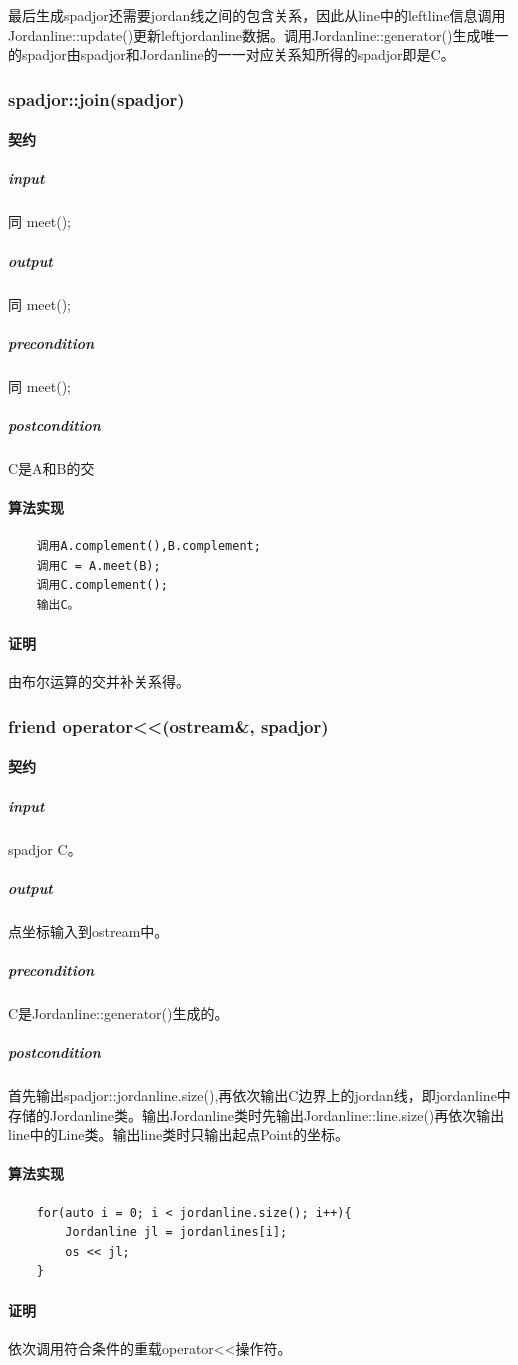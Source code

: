 \documentclass[a4paper]{book}
\numberwithin{equation}{chapter}
\theoremstyle{definition}
\begin{document}
	最后生成spadjor还需要jordan线之间的包含关系，因此从line中的leftline信息调用Jordanline::update()更新leftjordanline数据。调用Jordanline::generator()生成唯一的spadjor由spadjor和Jordanline的一一对应关系知所得的spadjor即是C。
	
\subsubsection{spadjor::join(spadjor)}
\paragraph{契约}
\subparagraph{input}
同 meet();
\subparagraph{output}
同 meet();
\subparagraph{precondition}
同 meet();
\subparagraph{postcondition}
C是A和B的交
\paragraph{算法实现}
\begin{lstlisting}
	调用A.complement(),B.complement;
	调用C = A.meet(B);
	调用C.complement();
	输出C。
\end{lstlisting}
\paragraph{证明}
	由布尔运算的交并补关系得。
	
\subsubsection{friend operator<<(ostream\&, spadjor)}
\paragraph{契约}
\subparagraph{input}
spadjor C。
\subparagraph{output}
点坐标输入到ostream中。
\subparagraph{precondition}
C是Jordanline::generator()生成的。
\subparagraph{postcondition}
首先输出spadjor::jordanline.size(),再依次输出C边界上的jordan线，即jordanline中存储的Jordanline类。输出Jordanline类时先输出Jordanline::line.size()再依次输出line中的Line类。输出line类时只输出起点Point的坐标。
\paragraph{算法实现}
\begin{lstlisting}
	for(auto i = 0; i < jordanline.size(); i++){
		Jordanline jl = jordanlines[i];
		os << jl;
	}
\end{lstlisting}
\paragraph{证明}
依次调用符合条件的重载operator<<操作符。
\end{document}
